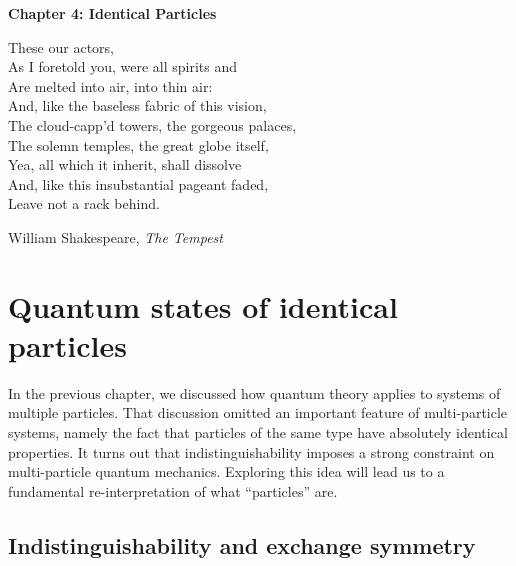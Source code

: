 \documentclass[prx,12pt]{revtex4-2}
\begin{document}
\setcounter{page}{60}

\begin{center}
{\Large \textbf{Chapter 4: Identical Particles}}
\end{center}

\epigraph{These our actors,\\As I foretold you, were all spirits
  and\\Are melted into air, into thin air: \\And, like the baseless
  fabric of this vision,\\ The cloud-capp'd towers, the gorgeous
  palaces,\\ The solemn temples, the great globe itself,\\ Yea, all
  which it inherit, shall dissolve\\And, like this insubstantial
  pageant faded, \\ Leave not a rack behind.}{William Shakespeare,
  \textit{The Tempest}}

\section{Quantum states of identical particles}

In the previous chapter, we discussed how quantum theory applies to
systems of multiple particles.  That discussion omitted an important
feature of multi-particle systems, namely the fact that particles of
the same type have absolutely identical properties.  It turns out that
indistinguishability imposes a strong constraint on multi-particle
quantum mechanics.  Exploring this idea will lead us to a fundamental
re-interpretation of what ``particles'' are.

\subsection{Indistinguishability and exchange symmetry}
\label{sec:exchange}
\end{document}
